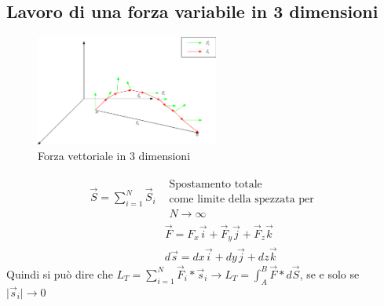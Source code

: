 \documentclass{book}
\newcommand{\abs}[1]{\lvert#1\rvert}
\begin{document}
\subsection{Lavoro di una forza variabile in 3 dimensioni}
\begin{figure}[th]
    \centering
    \includegraphics[width=6cm]{img/finiti/forza_vet_3d.eps}
    \caption{Forza vettoriale in 3 dimensioni}
\end{figure}
\begin{eqnarray*}
	\vec{S}=\displaystyle\sum_{i=1}^{N}\vec{S}_i & \begin{matrix}
		\text{Spostamento totale}\\
		\text{come limite della spezzata per}\\
		N\to \infty
	\end{matrix}\\
	& \vec{F}=F_x\vec{i}+\vec{F}_y\vec{j}+\vec{F}_z\vec{k}\\
	& d\vec{s}=dx\vec{i}+dy\vec{j}+dz\vec{k}
\end{eqnarray*}
Quindi si può dire che $L_T=\displaystyle\sum_{i=1}^{N}\vec{F}_i*\vec{s}_i\to
L_T=\int_{A}^{B}\vec{F}*d\vec{S}$, se e solo se $\abs{\vec{s}_i}\to 0$
\end{document}

